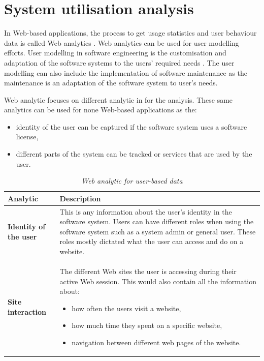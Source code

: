 \section{System utilisation analysis}\label{sec:ch1_systemUtilisation}
In Web-based applications, the process to get usage statistics and user behaviour data is called Web analytics \cite{Kocsis2012}. Web analytics can be used for user modelling efforts. User modelling in software engineering is the customisation and adaptation of the software systems to the users' required needs \cite{Waqar2017, Paliouras1999}. The user modelling can also include the implementation of software maintenance as the maintenance is an adaptation of the software system to user's needs.  \par Web analytic focuses on different analytic in  for the analysis. These same analytics can be used for none Web-based applications as the: 

\begin{itemize}
	\item identity of the user can be captured if the software system uses a software license,
	\item different parts of the system can be tracked or services that are used by the user.
\end{itemize} 

\begin{table}[!htb]
	\centering
	\caption[Web analytic for user-based data]
	{\textit{Web analytic for user-based data}}
	\label{tbl:ch1_webAnalytics}
	\begin{tabularx}{\textwidth}{|l|X|}
		\hline \textbf{Analytic}  & \textbf{Description} \\
		\hline \textbf{Identity of the user} & This is any information about the user's identity in the software system. Users can have different roles when using the software system such as a system admin or general user. These roles mostly dictated what the user can access and do on a website. \\
		\hline \textbf{Site interaction} & The different Web sites the user is accessing during their active Web session. This would also contain all the information about: 
		\begin{itemize}
			\item how often the users visit a website,
			\item how much time they spent on a specific website,
			\item navigation between different web pages of the website.
		\end{itemize}
		\\
		\hline
	\end{tabularx}
\end{table}

